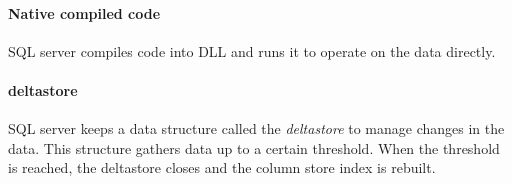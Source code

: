 \paragraph{Native compiled code}
\label{par:Native compiled code}
SQL server compiles code into DLL and runs it to operate on the data directly. 

\paragraph{deltastore}
\label{par:deltastore}
SQL server keeps a data structure called the \textit{deltastore} to manage changes in the data. This structure gathers data up to a certain threshold. When the threshold is reached, the deltastore closes and the column store index is rebuilt.

